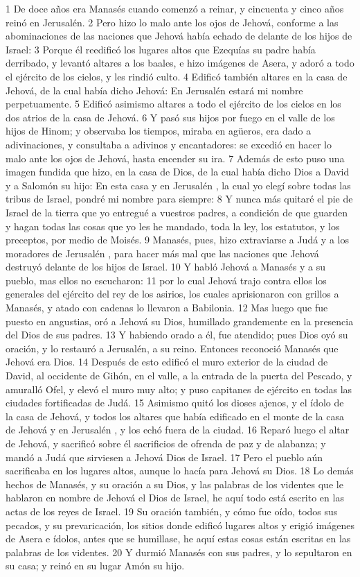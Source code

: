 1 De doce años era Manasés cuando comenzó a reinar, y cincuenta y cinco años reinó en Jerusalén.
2 Pero hizo lo malo ante los ojos de Jehová, conforme a las abominaciones de las naciones que Jehová había echado de delante de los hijos de Israel:
3 Porque él reedificó los lugares altos que Ezequías su padre había derribado, y levantó altares a los baales, e hizo imágenes de Asera, y adoró a todo el ejército de los cielos, y les rindió culto. 
4 Edificó también altares en la casa de Jehová, de la cual había dicho Jehová: En Jerusalén  estará mi nombre perpetuamente. 
5 Edificó asimismo altares a todo el ejército de los cielos en los dos atrios de la casa de Jehová.
6 Y pasó sus hijos por fuego en el valle de los hijos de Hinom; y observaba los tiempos, miraba en agüeros, era dado a adivinaciones, y consultaba a adivinos y encantadores: se excedió en hacer lo malo ante los ojos de Jehová, hasta encender su ira.
7 Además de esto puso una imagen fundida que hizo, en la casa de Dios, de la cual había dicho Dios a David y a Salomón su hijo: En esta casa y en Jerusalén , la cual yo elegí sobre todas las tribus de Israel, pondré mi nombre para siempre:
8 Y nunca más quitaré el pie de Israel de la tierra que yo entregué a vuestros padres, a condición de que guarden y hagan todas las cosas que yo les he mandado, toda la ley, los estatutos, y los preceptos, por medio de Moisés. 
9 Manasés, pues, hizo extraviarse a Judá y a los moradores de Jerusalén , para hacer más mal que las naciones que Jehová destruyó delante de los hijos de Israel.
10 Y habló Jehová a Manasés y a su pueblo, mas ellos no escucharon:
11 por lo cual Jehová trajo contra ellos los generales del ejército del rey de los asirios, los cuales aprisionaron con grillos a Manasés, y atado con cadenas lo llevaron a Babilonia.
12 Mas luego que fue puesto en angustias, oró a Jehová su Dios, humillado grandemente en la presencia del Dios de sus padres.
13 Y habiendo orado a él, fue atendido; pues Dios oyó su oración, y lo restauró a Jerusalén, a su reino. Entonces reconoció Manasés que Jehová era Dios.
14 Después de esto edificó el muro exterior de la ciudad de David, al occidente de Gihón, en el valle, a la entrada de la puerta del Pescado, y amuralló Ofel, y elevó el muro muy alto; y puso capitanes de ejército en todas las ciudades fortificadas de Judá.
15 Asimismo quitó los dioses ajenos, y el ídolo de la casa de Jehová, y todos los altares que había edificado en el monte de la casa de Jehová y en Jerusalén , y los echó fuera de la ciudad.
16 Reparó luego el altar de Jehová, y sacrificó sobre él sacrificios de ofrenda de paz y de alabanza; y mandó a Judá que sirviesen a Jehová Dios de Israel.
17 Pero el pueblo aún sacrificaba en los lugares altos, aunque lo hacía para Jehová su Dios.
18 Lo demás hechos de Manasés, y su oración a su Dios, y las palabras de los videntes que le hablaron en nombre de Jehová el Dios de Israel, he aquí todo está escrito en las actas de los reyes de Israel.
19 Su oración también, y cómo fue oído, todos sus pecados, y su prevaricación, los sitios donde edificó lugares altos y erigió imágenes de Asera e ídolos, antes que se humillase, he aquí estas cosas están escritas en las palabras de los videntes.
20 Y durmió Manasés con sus padres, y lo sepultaron en su casa; y reinó en su lugar Amón su hijo.

